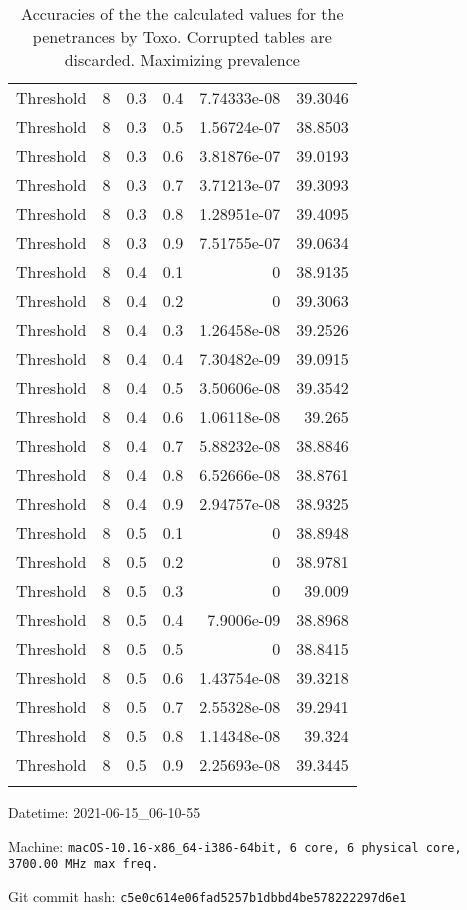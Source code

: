 \documentclass{article}
\begin{document}
\begin{longtable}[H]{lrrrrr}
 Threshold      &       8 &   0.3 &            0.4 &   7.74333e-08 &         39.3046 \\
 Threshold      &       8 &   0.3 &            0.5 &   1.56724e-07 &         38.8503 \\
 Threshold      &       8 &   0.3 &            0.6 &   3.81876e-07 &         39.0193 \\
 Threshold      &       8 &   0.3 &            0.7 &   3.71213e-07 &         39.3093 \\
 Threshold      &       8 &   0.3 &            0.8 &   1.28951e-07 &         39.4095 \\
 Threshold      &       8 &   0.3 &            0.9 &   7.51755e-07 &         39.0634 \\
 Threshold      &       8 &   0.4 &            0.1 &   0           &         38.9135 \\
 Threshold      &       8 &   0.4 &            0.2 &   0           &         39.3063 \\
 Threshold      &       8 &   0.4 &            0.3 &   1.26458e-08 &         39.2526 \\
 Threshold      &       8 &   0.4 &            0.4 &   7.30482e-09 &         39.0915 \\
 Threshold      &       8 &   0.4 &            0.5 &   3.50606e-08 &         39.3542 \\
 Threshold      &       8 &   0.4 &            0.6 &   1.06118e-08 &         39.265  \\
 Threshold      &       8 &   0.4 &            0.7 &   5.88232e-08 &         38.8846 \\
 Threshold      &       8 &   0.4 &            0.8 &   6.52666e-08 &         38.8761 \\
 Threshold      &       8 &   0.4 &            0.9 &   2.94757e-08 &         38.9325 \\
 Threshold      &       8 &   0.5 &            0.1 &   0           &         38.8948 \\
 Threshold      &       8 &   0.5 &            0.2 &   0           &         38.9781 \\
 Threshold      &       8 &   0.5 &            0.3 &   0           &         39.009  \\
 Threshold      &       8 &   0.5 &            0.4 &   7.9006e-09  &         38.8968 \\
 Threshold      &       8 &   0.5 &            0.5 &   0           &         38.8415 \\
 Threshold      &       8 &   0.5 &            0.6 &   1.43754e-08 &         39.3218 \\
 Threshold      &       8 &   0.5 &            0.7 &   2.55328e-08 &         39.2941 \\
 Threshold      &       8 &   0.5 &            0.8 &   1.14348e-08 &         39.324  \\
 Threshold      &       8 &   0.5 &            0.9 &   2.25693e-08 &         39.3445 \\
\hline

\caption{Accuracies of the the calculated values for the penetrances by Toxo. Corrupted tables are discarded. Maximizing prevalence}
\end{longtable}
Datetime: 2021-06-15\_06-10-55

Machine: \texttt{macOS-10.16-x86\_64-i386-64bit, 6 core, 6 physical core, 3700.00 MHz max freq.}

Git commit hash: \texttt{c5e0c614e06fad5257b1dbbd4be578222297d6e1}
\end{document}
